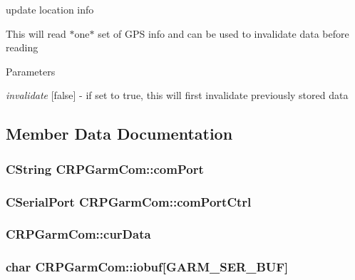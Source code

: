 update location info 

This will read $\ast$one$\ast$ set of GPS info and can be used to invalidate data before reading 
\begin{DoxyParams}{Parameters}
\item[{\em invalidate}]\mbox{[}false\mbox{]} -\/ if set to true, this will first invalidate previously stored data \end{DoxyParams}


\subsection{Member Data Documentation}
\hypertarget{classCRPGarmCom_a116e8d3aeef702bac9ee730fd7732dda}{
\subsubsection[{comPort}]{\setlength{\rightskip}{0pt plus 5cm}CString {\bf CRPGarmCom::comPort}}}
\label{classCRPGarmCom_a116e8d3aeef702bac9ee730fd7732dda}
\hypertarget{classCRPGarmCom_ad34e4fe761769eff8304542339c8a764}{
\subsubsection[{comPortCtrl}]{\setlength{\rightskip}{0pt plus 5cm}CSerialPort {\bf CRPGarmCom::comPortCtrl}}}
\label{classCRPGarmCom_ad34e4fe761769eff8304542339c8a764}
\hypertarget{classCRPGarmCom_a164f7f5d1a9bbb3346b2b52f33f10c7a}{
\subsubsection[{curData}]{ {\bf CRPGarmCom::curData}}}
\label{classCRPGarmCom_a164f7f5d1a9bbb3346b2b52f33f10c7a}
\hypertarget{classCRPGarmCom_af309c1b2cacb0d9c11156890c7e9777d}{
\subsubsection[{iobuf}]{\setlength{\rightskip}{0pt plus 5cm}char {\bf CRPGarmCom::iobuf}\mbox{[}GARM\_\-SER\_\-BUF\mbox{]}}}
